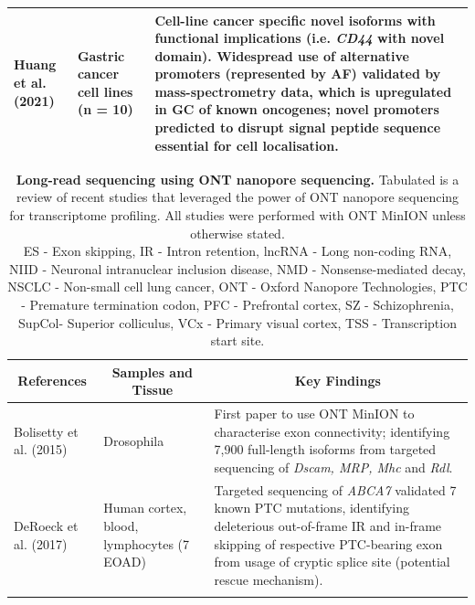 \begin{landscape}
\begin{longtable}[c]{p{4cm}p{4cm}p{18cm}}
		\centering Huang et al. (2021) \cite{Huang2021} &
		\centering Gastric cancer cell lines (n = 10) &
		\tabitem Cell-line cancer specific novel isoforms with functional implications (i.e. \textit{CD44} with novel domain). \newline
		\tabitem Widespread use of alternative promoters (represented by AF) validated by mass-spectrometry data, which is upregulated in GC of known oncogenes; novel promoters predicted to disrupt signal peptide sequence essential for cell localisation.   \\* \bottomrule
	\end{longtable}
	\clearpage
	\begin{longtable}[c]{p{4cm}p{4cm}p{18cm}}
		\caption[Long-read sequencing using ONT nanopore sequencing]%
		{\textbf{Long-read sequencing using ONT nanopore sequencing.} Tabulated is a review of recent studies that leveraged the power of ONT nanopore sequencing for transcriptome profiling. All studies were performed with ONT MinION unless otherwise stated. \newline ES - Exon skipping, IR - Intron retention, lncRNA - Long non-coding RNA, NIID - Neuronal intranuclear inclusion disease, NMD - Nonsense-mediated decay, NSCLC - Non-small cell lung cancer, ONT - Oxford Nanopore Technologies, PTC - Premature termination codon, PFC - Prefrontal cortex, SZ - Schizophrenia, SupCol- Superior colliculus, VCx - Primary visual cortex, TSS - Transcription start site.}
		\label{tab: longread_ontstudies}\\
		
		\toprule
		\multicolumn{1}{c}{References} &
		\multicolumn{1}{c}{Samples and Tissue} &
		\multicolumn{1}{c}{Key Findings} \\* \midrule
		\endfirsthead
		\endhead
		\bottomrule
		\endfoot
		\endlastfoot
		\centering Bolisetty et al. (2015)\cite{Bolisetty2015} &
		\centering Drosophila &
		\tabitem First paper to use ONT MinION to characterise exon connectivity; identifying 7,900 full-length isoforms from targeted sequencing of \textit{Dscam, MRP, Mhc} and \textit{Rdl}.  \\
		\hdashline[0.5pt/5pt]
		
		\centering DeRoeck et al. (2017)\cite{DeRoeck2017}  &
		\centering Human cortex, blood, lymphocytes (7 EOAD) &
		\tabitem Targeted sequencing of \textit{ABCA7} validated 7 known PTC mutations, identifying deleterious out-of-frame IR and in-frame skipping of respective PTC-bearing exon from usage of cryptic splice site (potential rescue mechanism). \\
		\hdashline[0.5pt/5pt]
		

\end{longtable}
\end{landscape}

